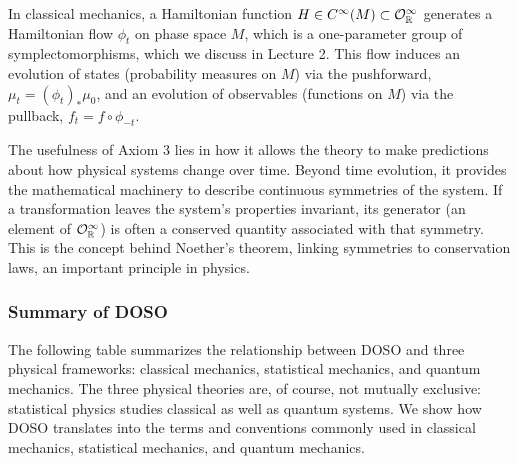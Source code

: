 \begin{example}
In classical mechanics, a Hamiltonian function $H \in C^\infty(M) \subset \mathcal{O}_{\mathbb{R}}^{\infty}$ generates a Hamiltonian flow $\phi_t$ on phase space $M$, which is a one-parameter group of symplectomorphisms, which we discuss in Lecture 2. This flow induces an evolution of states (probability measures on $M$) via the pushforward, $\mu_t = (\phi_t)_* \mu_0$, and an evolution of observables (functions on $M$) via the pullback, $f_t = f \circ \phi_{-t}$.
\end{example}

The usefulness of Axiom 3 lies in how it allows the theory to make predictions about how physical systems change over time. Beyond time evolution, it provides the mathematical machinery to describe continuous symmetries of the system. If a transformation leaves the system's properties invariant, its generator (an element of $\mathcal{O}_{\mathbb{R}}^{\infty}$) is often a conserved quantity associated with that symmetry. This is the concept behind Noether's theorem, linking symmetries to conservation laws, an important principle in physics.


\subsubsection{Summary of DOSO}
The following table summarizes the relationship between DOSO and three physical frameworks: classical mechanics, statistical mechanics, and quantum mechanics. The three physical theories are, of course, not mutually exclusive: statistical physics studies classical as well as quantum systems. We show how DOSO translates into the terms and conventions commonly used in classical mechanics, statistical mechanics, and quantum mechanics.

